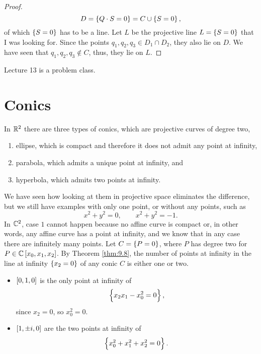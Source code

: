 \begin{proof}
$$ D = \cbr{Q \cdot S = 0} = C \cup \cbr{S = 0}, $$
of which $ \cbr{S = 0} $ has to be a line. Let $ L $ be the projective line $ L = \cbr{S = 0} $ that I was looking for. Since the points $ q_1, q_2, q_3 \in D_1 \cap D_2 $, they also lie on $ D $. We have seen that $ q_1, q_2, q_3 \notin C $, thus, they lie on $ L $.
\end{proof}


Lecture 13 is a problem class.

\pagebreak

\section{Conics}


In $ \mathbb{R}^2 $ there are three types of conics, which are projective curves of degree two,
\begin{enumerate}
\item ellipse, which is compact and therefore it does not admit any point at infinity,
\item parabola, which admits a unique point at infinity, and
\item hyperbola, which admits two points at infinity.
\end{enumerate}
We have seen how looking at them in projective space eliminates the difference, but we still have examples with only one point, or without any points, such as
$$ x^2 + y^2 = 0, \qquad x^2 + y^2 = -1. $$
In $ \mathbb{C}^2 $, case $ 1 $ cannot happen because no affine curve is compact or, in other words, any affine curve has a point at infinity, and we know that in any case there are infinitely many points. Let $ C = \cbr{P = 0} $, where $ P $ has degree two for $ P \in \CC\sbr{x_0, x_1, x_2} $. By Theorem \ref{thm:9.8}, the number of points at infinity in the line at infinity $ \cbr{x_2 = 0} $ of any conic $ C $ is either one or two.

\begin{example}
\hfill
\begin{itemize}
\item $ \sbr{0, 1, 0} $ is the only point at infinity of
$$ \cbr{x_2x_1 - x_0^2 = 0}, $$
since $ x_2 = 0 $, so $ x_0^2 = 0 $.
\item $ \sbr{1, \pm i, 0} $ are the two points at infinity of
$$ \cbr{x_0^2 + x_1^2 + x_2^2 = 0}. $$
\end{itemize}
\end{example}

